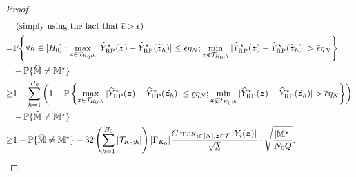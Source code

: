 \documentclass[12pt]{article}
\begin{document}
\begin{proof}
\begin{align*}
        &\text{ (simply using the fact that $\overline{\epsilon} > \underline{\epsilon}$)} \\
        = & {\mathbb{P}}\Bigg\{\forall h \in [H_0]:   \max_{{\boldsymbol{z}}\in{\mathcal{T}}_{K_0;h}}|{\widehat{Y}}^\star_{\operatorname{RP}}({\boldsymbol{z}})-{\widehat{Y}}^\star_{\operatorname{RP}}(\widetilde{{\boldsymbol{z}}}_h)| \le \underline{\epsilon}\eta_N;  \min_{{\boldsymbol{z}}\notin{\mathcal{T}}_{K_0;h}}|{\widehat{Y}}^\star_{\operatorname{RP}}({\boldsymbol{z}})-{\widehat{Y}}^\star_{\operatorname{RP}}(\widetilde{{\boldsymbol{z}}}_h)| > \overline{\epsilon}\eta_N\Bigg\} \\
        &- {\mathbb{P}}\{\widehat{{\mathbb{M}}}\neq {\mathbb{M}}^\star\}\\
        \ge & 1 - \sum_{h=1}^{H_0}\left(1 - {\mathbb{P}}\left\{\max_{{\boldsymbol{z}}\in{\mathcal{T}}_{K_0;h}}|{\widehat{Y}}^\star_{\operatorname{RP}}({\boldsymbol{z}})-{\widehat{Y}}^\star_{\operatorname{RP}}(\widetilde{{\boldsymbol{z}}}_h)| \le \underline{\epsilon}\eta_N;  \min_{{\boldsymbol{z}}\notin{\mathcal{T}}_{K_0;h}}|{\widehat{Y}}^\star_{\operatorname{RP}}({\boldsymbol{z}})-{\widehat{Y}}^\star_{\operatorname{RP}}(\widetilde{{\boldsymbol{z}}}_h)| > \overline{\epsilon}\eta_N\right\}\right) \\
        & - {\mathbb{P}}\{\widehat{{\mathbb{M}}}\neq {\mathbb{M}}^\star\}\\
        \ge & 1 - {\mathbb{P}}\{\widehat{{\mathbb{M}}}\neq {\mathbb{M}}^\star\} - 32\left(\sum_{h=1}^{H_0}|{\mathcal{T}}_{K_0;h}|\right) |\Gamma_{K_0}| \frac{C \max_{i\in[N],{\boldsymbol{z}}\in{\mathcal{T}}}|\breve{Y}_i({\boldsymbol{z}})| }{\sqrt{\underline{\lambda}}}\cdot \sqrt{\frac{|{\mathbb{M}}^\star|}{N_0 Q}}.
    \end{align*}
    \endgroup


\end{proof}
\end{document}
